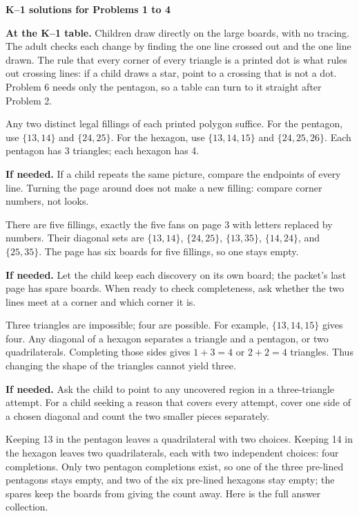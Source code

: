 \documentclass[11pt,letterpaper]{article}
\newcommand{\pagehead}[1]{{\Large\bfseries #1}\par\vspace{3pt}}
\newcommand{\prob}[2]{\par\vspace{5pt}{\large\bfseries #1}\par #2}
\newcommand{\hint}[1]{\par\textbf{If needed.} #1\par}
\begin{document}
\newpage
\pagehead{K--1 solutions for Problems 1 to 4}
\textbf{At the K--1 table.} Children draw directly on the large boards, with no tracing. The adult checks each change by finding the one line crossed out and the one line drawn. The rule that every corner of every triangle is a printed dot is what rules out crossing lines: if a child draws a star, point to a crossing that is not a dot. Problem 6 needs only the pentagon, so a table can turn to it straight after Problem 2.
\prob{Problem 1}{Any two distinct legal fillings of each printed polygon suffice. For the pentagon, use $\{13,14\}$ and $\{24,25\}$. For the hexagon, use $\{13,14,15\}$ and $\{24,25,26\}$. Each pentagon has 3 triangles; each hexagon has 4.}
\hint{If a child repeats the same picture, compare the endpoints of every line. Turning the page around does not make a new filling: compare corner numbers, not looks.}
\prob{Problem 2}{There are five fillings, exactly the five fans on page 3 with letters replaced by numbers. Their diagonal sets are $\{13,14\}$, $\{24,25\}$, $\{13,35\}$, $\{14,24\}$, and $\{25,35\}$. The page has six boards for five fillings, so one stays empty.}
\hint{Let the child keep each discovery on its own board; the packet's last page has spare boards. When ready to check completeness, ask whether the two lines meet at a corner and which corner it is.}
\prob{Problem 3}{Three triangles are impossible; four are possible. For example, $\{13,14,15\}$ gives four. Any diagonal of a hexagon separates a triangle and a pentagon, or two quadrilaterals. Completing those sides gives $1+3=4$ or $2+2=4$ triangles. Thus changing the shape of the triangles cannot yield three.}
\hint{Ask the child to point to any uncovered region in a three-triangle attempt. For a child seeking a reason that covers every attempt, cover one side of a chosen diagonal and count the two smaller pieces separately.}
\prob{Problem 4}{Keeping 13 in the pentagon leaves a quadrilateral with two choices. Keeping 14 in the hexagon leaves two quadrilaterals, each with two independent choices: four completions. Only two pentagon completions exist, so one of the three pre-lined pentagons stays empty, and two of the six pre-lined hexagons stay empty; the spares keep the boards from giving the count away. Here is the full answer collection.}
\end{document}
